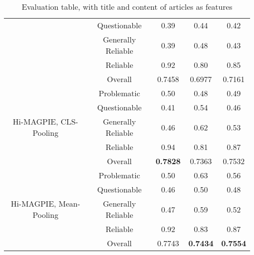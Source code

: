 \begin{table}[htbp]
\begin{longtable}{| c | c | c | c | c |}
                                                          & Questionable       & 0.39               & 0.44            & 0.42            \\
                                                          & Generally Reliable & 0.39               & 0.48            & 0.43            \\
                                                          & Reliable           & 0.92               & 0.80            & 0.85            \\\cline{2-5}
                                                          & Overall            & 0.7458             & 0.6977          & 0.7161          \\
        \hline
        \multirow{5}{*}{Hi-MAGPIE, CLS-Pooling}           & Problematic        & 0.50               & 0.48            & 0.49            \\
                                                          & Questionable       & 0.41               & 0.54            & 0.46            \\
                                                          & Generally Reliable & 0.46               & 0.62            & 0.53            \\
                                                          & Reliable           & 0.94               & 0.81            & 0.87            \\\cline{2-5}
                                                          & Overall            & \textbf{0.7828}    & 0.7363          & 0.7532          \\
        \hline
        \multirow{5}{*}{Hi-MAGPIE, Mean-Pooling}          & Problematic        & 0.50               & 0.63            & 0.56            \\
                                                          & Questionable       & 0.46               & 0.50            & 0.48            \\
                                                          & Generally Reliable & 0.47               & 0.59            & 0.52            \\
                                                          & Reliable           & 0.92               & 0.83            & 0.87            \\\cline{2-5}
                                                          & Overall            & 0.7743             & \textbf{0.7434} & \textbf{0.7554} \\
        \hline
    \end{longtable}
    \caption{Evaluation table, with title and content of articles as features}
    \label{table:eval}
\end{table}


